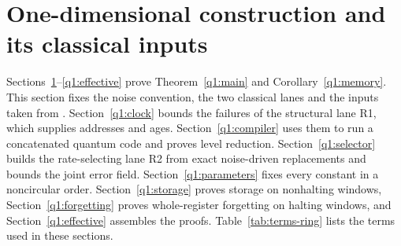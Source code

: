 \section{One-dimensional construction and its classical inputs}\label{q1:model}
Sections~\ref{q1:model}--\ref{q1:effective} prove Theorem~\ref{q1:main} and Corollary~\ref{q1:memory}. This section fixes the noise convention, the two classical lanes and the inputs taken from \cite{DMNoise1D2026}. Section~\ref{q1:clock} bounds the failures of the structural lane R1, which supplies addresses and ages. Section~\ref{q1:compiler} uses them to run a concatenated quantum code and proves level reduction. Section~\ref{q1:selector} builds the rate-selecting lane R2 from exact noise-driven replacements and bounds the joint error field. Section~\ref{q1:parameters} fixes every constant in a noncircular order. Section~\ref{q1:storage} proves storage on nonhalting windows, Section~\ref{q1:forgetting} proves whole-register forgetting on halting windows, and Section~\ref{q1:effective} assembles the proofs. Table~\ref{tab:terms-ring} lists the terms used in these sections.

